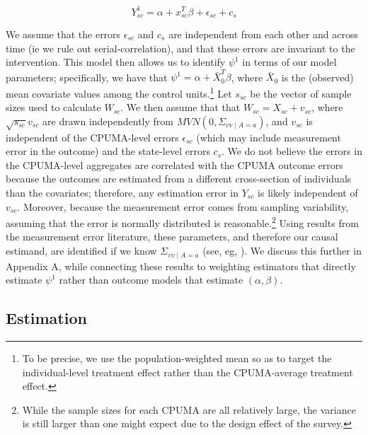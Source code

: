 \documentclass[12pt]{article}
\begin{document}
$$
Y_{sc}^1 = \alpha + x_{sc}^T\beta + \epsilon_{sc} + c_s
$$

We assume that the errors $\epsilon_{sc}$ and $c_s$ are independent from each other and across time (ie we rule out serial-correlation), and that these errors are invariant to the intervention. This model then allows us to identify $\psi^1$ in terms of our model parameters; specifically, we have that $\psi^1 = \alpha + \bar{X}_0^T\beta$, where $\bar{X}_0$ is the (observed) mean covariate values among the control units.\footnote{To be precise, we use the population-weighted mean so as to target the individual-level treatment effect rather than the CPUMA-average treatment effect.} Let $s_{sc}$ be the vector of sample sizes used to calculate $W_{sc}$. We then assume that that $W_{sc} = X_{sc} + v_{sc}$, where $\sqrt{s_{sc}}v_{sc}$ are drawn independently from $MVN(0, \Sigma_{vv \mid A = a})$, and $v_{sc}$ is independent of the CPUMA-level errors $\epsilon_{sc}$ (which may include measurement error in the outcome) and the state-level errors $c_s$. We do not believe the errors in the CPUMA-level aggregates are correlated with the CPUMA outcome errors because the outcomes are estimated from a different cross-section of individuals than the covariates; therefore, any estimation error in $Y_{sc}$ is likely independent of $v_{sc}$. Moreover, because the measurement error comes from sampling variability, assuming that the error is normally distributed is reasonable.\footnote{While the sample sizes for each CPUMA are all relatively large, the variance is still larger than one might expect due to the design effect of the survey.} Using results from the measurement error literature, these parameters, and therefore our causal estimand, are identified if we know $\Sigma_{vv \mid A = a}$ (see, eg, \cite{gleser1992importance}). We discuss this further in Appendix A, while connecting these results to weighting estimators that directly estimate $\psi^1$ rather than outcome models that estimate $(\alpha, \beta)$. 

\subsection{Estimation}
\end{document}
